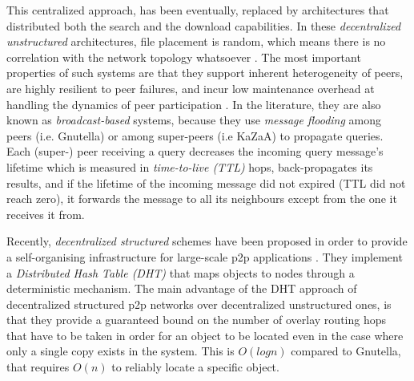 \documentclass[a4paper,10pt]{article}
\begin{document}
This centralized approach, has been eventually, replaced by architectures that distributed both the search and the download capabilities. In these \emph{decentralized unstructured} architectures, file placement is random, which means there is no correlation with the network topology whatsoever \cite{yang_improvep2psearch_2002}. The most important properties of such systems are that they support inherent heterogeneity of peers, are highly resilient to peer failures, and incur low maintenance overhead at handling the dynamics of peer participation \cite{stutzbach_churn_2006}. In the literature, they are also known as \emph{broadcast-based} systems, because they use \emph{message flooding} among peers (i.e. Gnutella\cite{gnutella}) or among super-peers (i.e KaZaA\cite{kazaa}) to propagate queries. Each (super-) peer receiving a query decreases the incoming query message's lifetime which is measured in \emph{time-to-live (TTL)} hops, back-propagates its results, and  if the lifetime of the incoming message did not expired (TTL did not reach zero), it forwards the message to all its neighbours except from the one it receives it from.

Recently, \emph{decentralized structured} schemes have been proposed in order to provide a self-organising infrastructure for large-scale p2p applications \cite{ratnasamy_can_2001, stoica_chord_2001, antony_pastry_2001, zhao_tapestry_2001, maymounkov_kademlia_2002}. They implement a \emph{Distributed Hash Table (DHT)} that maps objects to nodes through a deterministic mechanism. The main advantage of the DHT approach of decentralized structured p2p networks over decentralized unstructured ones, is that they provide a guaranteed bound on the number of overlay routing hops that have to be taken in order for an object to be located even in the case where only a single copy exists in the system. This is $O \left ( log n \right )$ compared to Gnutella, that requires $O \left ( n \right )$ to reliably locate a specific object.
\end{document}
